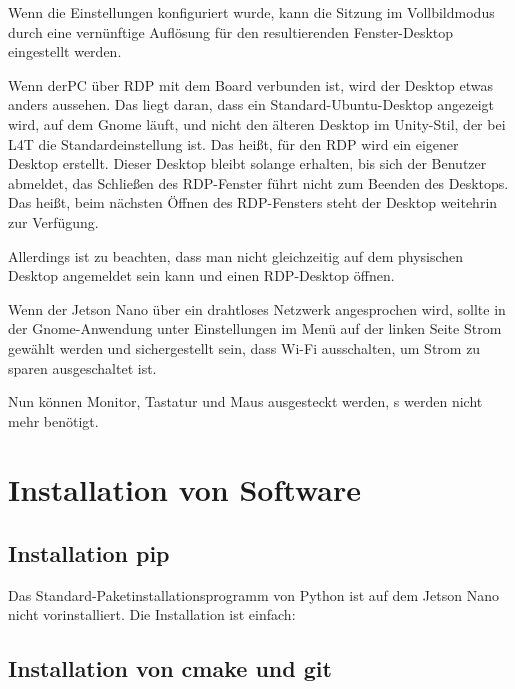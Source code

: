 Wenn die Einstellungen konfiguriert wurde, kann die Sitzung im Vollbildmodus durch eine vernünftige Auflösung 
für den resultierenden Fenster-Desktop eingestellt werden. 

Wenn derPC über RDP mit dem Board verbunden ist, wird der Desktop etwas anders aussehen. Das liegt daran, dass  ein Standard-Ubuntu-Desktop angezeigt wird, auf dem Gnome läuft, und nicht den älteren Desktop im Unity-Stil, der bei L4T die Standardeinstellung ist. Das heißt, für den RDP wird ein eigener Desktop erstellt. Dieser
Desktop bleibt solange erhalten, bis sich der Benutzer abmeldet, das Schließen des RDP-Fenster führt nicht zum
Beenden des Desktops. Das heißt, beim nächsten Öffnen des RDP-Fensters steht der Desktop weitehrin zur Verfügung.


Allerdings ist zu beachten, dass man nicht gleichzeitig  auf dem physischen Desktop angemeldet sein kann  und einen RDP-Desktop öffnen.

Wenn der Jetson Nano über ein  drahtloses Netzwerk angesprochen wird, sollte in der Gnome-Anwendung 
unter \glqq Einstellungen\grqq{} im Menü auf der linken Seite \glqq Strom\grqq{} 
gewählt werden und sichergestellt sein, dass \glqq Wi-Fi ausschalten, um Strom zu sparen\grqq{} 
ausgeschaltet ist.


Nun können Monitor, Tastatur und Maus ausgesteckt werden, s werden nicht mehr benötigt.




\section{Installation von Software}

\subsection{Installation  pip}

Das Standard-Paketinstallationsprogramm  von Python ist auf dem Jetson Nano nicht vorinstalliert. Die Installation ist einfach:

\medskip


\medskip



	

\subsection{Installation von cmake und git}

